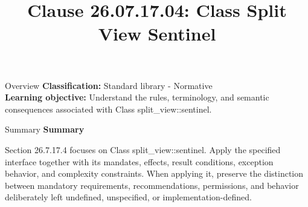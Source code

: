\documentclass[10pt,letterpaper]{article}
\title{Clause 26.07.17.04: Class Split View Sentinel}
\author{}
\date{}
\begin{document}
\maketitle
\begin{CornellOverviewBox}{Overview}
\textbf{Classification:} Standard library - Normative\\[2pt]
\textbf{Learning objective:} Understand the rules, terminology, and semantic consequences associated with Class split\_view::sentinel.
\end{CornellOverviewBox}\begin{CornellSummaryBox}{Summary}
{\sffamily\bfseries\color{Accent} Summary}\par\vspace{3pt}Section 26.7.17.4 focuses on Class split\_view::sentinel. Apply the specified interface together with its mandates, effects, result conditions, exception behavior, and complexity constraints. When applying it, preserve the distinction between mandatory requirements, recommendations, permissions, and behavior deliberately left undefined, unspecified, or implementation-defined.
\end{CornellSummaryBox}
\end{document}
